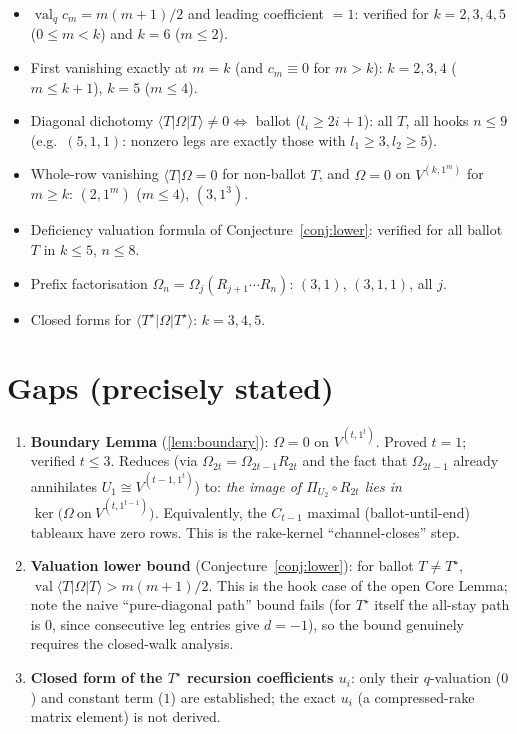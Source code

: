 \documentclass[11pt]{article}
\theoremstyle{definition}
\newcommand{\Om}{\Omega}
\DeclareMathOperator{\val}{val}
\begin{document}
\begin{itemize}
\item $\val_q c_m=m(m+1)/2$ and leading coefficient $=1$: verified for $k=2,3,4,5$
($0\le m<k$) and $k=6$ ($m\le 2$).
\item First vanishing exactly at $m=k$ (and $c_m\equiv0$ for $m>k$): $k=2,3,4$ ($m\le k+1$),
$k=5$ ($m\le 4$).
\item Diagonal dichotomy $\langle T|\Om|T\rangle\ne0\iff$ ballot ($l_i\ge2i+1$): all $T$, all
hooks $n\le 9$ (e.g.\ $(5,1,1)$: nonzero legs are exactly those with $l_1\ge3,l_2\ge5$).
\item Whole-row vanishing $\langle T|\Om=0$ for non-ballot $T$, and $\Om=0$ on $V^{(k,1^m)}$ for
$m\ge k$: $(2,1^m)$ ($m\le 4$), $(3,1^3)$.
\item Deficiency valuation formula of Conjecture~\ref{conj:lower}: verified for all ballot $T$
in $k\le 5$, $n\le 8$.
\item Prefix factorisation $\Om_n=\Om_j(R_{j+1}\cdots R_n)$: $(3,1)$, $(3,1,1)$, all $j$.
\item Closed forms for $\langle T^\star|\Om|T^\star\rangle$: $k=3,4,5$.
\end{itemize}

\section{Gaps (precisely stated)}

\begin{enumerate}
\item \textbf{Boundary Lemma} (\ref{lem:boundary}): $\Om=0$ on $V^{(t,1^t)}$. Proved $t=1$;
verified $t\le3$. Reduces (via $\Om_{2t}=\Om_{2t-1}R_{2t}$ and the fact that $\Om_{2t-1}$
already annihilates $U_1\cong V^{(t-1,1^t)}$) to: \emph{the image of $\Pi_{U_2}\circ R_{2t}$ lies
in $\ker\bigl(\Om\ \text{on}\ V^{(t,1^{t-1})}\bigr)$.} Equivalently, the $C_{t-1}$ maximal
(ballot-until-end) tableaux have zero rows. This is the rake-kernel ``channel-closes'' step.
\item \textbf{Valuation lower bound} (Conjecture~\ref{conj:lower}): for ballot $T\ne T^\star$,
$\val\langle T|\Om|T\rangle>m(m+1)/2$. This is the hook case of the open Core Lemma; note the
naive ``pure-diagonal path'' bound fails (for $T^\star$ itself the all-stay path is $0$, since
consecutive leg entries give $d=-1$), so the bound genuinely requires the closed-walk analysis.
\item \textbf{Closed form of the $T^\star$ recursion coefficients $u_i$}: only their
$q$-valuation ($0$) and constant term ($1$) are established; the exact $u_i$ (a compressed-rake
matrix element) is not derived.
\end{enumerate}
\end{document}
